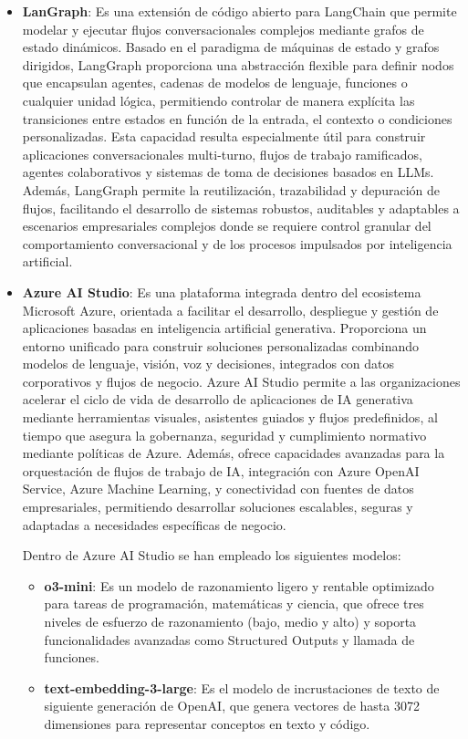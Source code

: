 \begin{itemize}
    \item \textbf{LanGraph}: Es una extensión de código abierto para LangChain que permite modelar y ejecutar flujos conversacionales complejos mediante grafos de estado dinámicos. 
    Basado en el paradigma de máquinas de estado y grafos dirigidos, LangGraph proporciona una abstracción flexible para definir nodos que encapsulan agentes, cadenas de modelos de lenguaje, funciones o cualquier unidad lógica, permitiendo controlar de manera explícita las transiciones entre estados en función de la entrada, el contexto o condiciones personalizadas. 
    Esta capacidad resulta especialmente útil para construir aplicaciones conversacionales multi-turno, flujos de trabajo ramificados, agentes colaborativos y sistemas de toma de decisiones basados en LLMs. 
    Además, LangGraph permite la reutilización, trazabilidad y depuración de flujos, facilitando el desarrollo de sistemas robustos, auditables y adaptables a escenarios empresariales complejos donde se requiere control granular del comportamiento conversacional y de los procesos impulsados por inteligencia artificial.
    
    \item \textbf{Azure AI Studio}: Es una plataforma integrada dentro del ecosistema Microsoft Azure, orientada a facilitar el desarrollo, despliegue y gestión de aplicaciones basadas en inteligencia artificial generativa. 
    Proporciona un entorno unificado para construir soluciones personalizadas combinando modelos de lenguaje, visión, voz y decisiones, integrados con datos corporativos y flujos de negocio. 
    Azure AI Studio permite a las organizaciones acelerar el ciclo de vida de desarrollo de aplicaciones de IA generativa mediante herramientas visuales, asistentes guiados y flujos predefinidos, al tiempo que asegura la gobernanza, seguridad y cumplimiento normativo mediante políticas de Azure. 
    Además, ofrece capacidades avanzadas para la orquestación de flujos de trabajo de IA, integración con Azure OpenAI Service, Azure Machine Learning, y conectividad con fuentes de datos empresariales, permitiendo desarrollar soluciones escalables, seguras y adaptadas a necesidades específicas de negocio.

    Dentro de Azure AI Studio se han empleado los siguientes modelos:
    \begin{itemize}
        \item \textbf{o3-mini}: Es un modelo de razonamiento ligero y rentable optimizado para tareas de programación, matemáticas y ciencia, que ofrece tres niveles de esfuerzo de razonamiento (bajo, medio y alto) y soporta funcionalidades avanzadas como Structured Outputs y llamada de funciones.
        \item \textbf{text-embedding-3-large}: Es el modelo de incrustaciones de texto de siguiente generación de OpenAI, que genera vectores de hasta 3072 dimensiones para representar conceptos en texto y código.
    \end{itemize}


\end{itemize}
